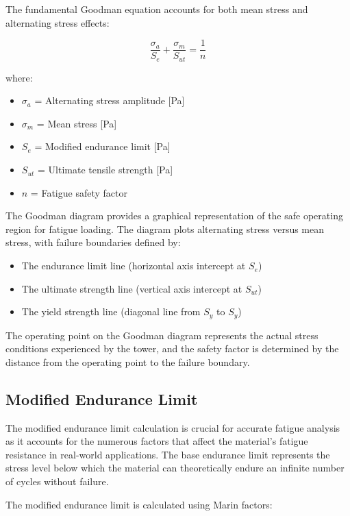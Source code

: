 \documentclass[12pt]{article}
\begin{document}
The fundamental Goodman equation accounts for both mean stress and alternating stress effects:

\begin{equation}
\frac{\sigma_a}{S_e} + \frac{\sigma_m}{S_{ut}} = \frac{1}{n}
\end{equation}

where:
\begin{itemize}
    \item $\sigma_a$ = Alternating stress amplitude [Pa]
    \item $\sigma_m$ = Mean stress [Pa]
    \item $S_e$ = Modified endurance limit [Pa]
    \item $S_{ut}$ = Ultimate tensile strength [Pa]
    \item $n$ = Fatigue safety factor
\end{itemize}

The Goodman diagram provides a graphical representation of the safe operating region for fatigue loading. The diagram plots alternating stress versus mean stress, with failure boundaries defined by:
\begin{itemize}
    \item The endurance limit line (horizontal axis intercept at $S_e$)
    \item The ultimate strength line (vertical axis intercept at $S_{ut}$)
    \item The yield strength line (diagonal line from $S_y$ to $S_y$)
\end{itemize}

The operating point on the Goodman diagram represents the actual stress conditions experienced by the tower, and the safety factor is determined by the distance from the operating point to the failure boundary.

\subsection{Modified Endurance Limit}

The modified endurance limit calculation is crucial for accurate fatigue analysis as it accounts for the numerous factors that affect the material's fatigue resistance in real-world applications. The base endurance limit represents the stress level below which the material can theoretically endure an infinite number of cycles without failure.

The modified endurance limit is calculated using Marin factors:
\end{document}
